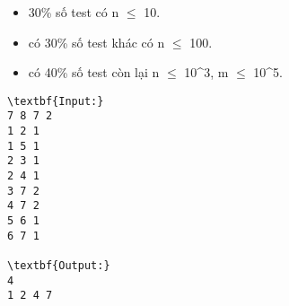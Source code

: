 \begin{itemize}
	\item 30\% số test có n  $\le$  10.
	\item có 30\% số test khác có n  $\le$  100.
	\item có 40\% số test còn lại n  $\le$  10^3, m  $\le$  10^5.
\end{itemize}
\begin{verbatim}
\textbf{Input:}
7 8 7 2
1 2 1
1 5 1
2 3 1
2 4 1
3 7 2
4 7 2
5 6 1
6 7 1

\textbf{Output:}
4
1 2 4 7
\end{verbatim}